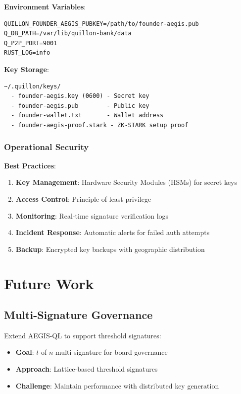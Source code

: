 \documentclass[11pt,a4paper]{article}
\begin{document}
\begin{tcolorbox}[colback=codebg,colframe=black!30]
\small
\textbf{Environment Variables}:
\begin{verbatim}
QUILLON_FOUNDER_AEGIS_PUBKEY=/path/to/founder-aegis.pub
Q_DB_PATH=/var/lib/quillon-bank/data
Q_P2P_PORT=9001
RUST_LOG=info
\end{verbatim}

\textbf{Key Storage}:
\begin{verbatim}
~/.quillon/keys/
  - founder-aegis.key (0600) - Secret key
  - founder-aegis.pub        - Public key
  - founder-wallet.txt       - Wallet address
  - founder-aegis-proof.stark - ZK-STARK setup proof
\end{verbatim}
\end{tcolorbox}

\subsubsection{Operational Security}

\textbf{Best Practices}:
\begin{enumerate}[leftmargin=*]
    \item \textbf{Key Management}: Hardware Security Modules (HSMs) for secret keys
    \item \textbf{Access Control}: Principle of least privilege
    \item \textbf{Monitoring}: Real-time signature verification logs
    \item \textbf{Incident Response}: Automatic alerts for failed auth attempts
    \item \textbf{Backup}: Encrypted key backups with geographic distribution
\end{enumerate}

\section{Future Work}

\subsection{Multi-Signature Governance}

Extend AEGIS-QL to support threshold signatures:

\begin{itemize}[leftmargin=*]
    \item \textbf{Goal}: $t$-of-$n$ multi-signature for board governance
    \item \textbf{Approach}: Lattice-based threshold signatures \cite{boneh2018}
    \item \textbf{Challenge}: Maintain performance with distributed key generation
\end{itemize}
\end{document}
